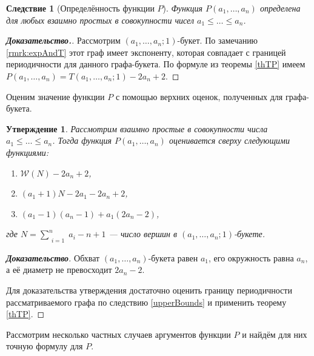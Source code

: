 \documentclass[12pt]{article}
\newtheorem{proposition}[theorem]{Утверждение}
\newtheorem{corollary}[theorem]{Следствие}
\theoremstyle{definition}
\begin{document}
\begin{corollary}[Определённость функции $P$]
Функция $P(a_1, \dots, a_n)$ определена для любых взаимно простых в совокупности чисел $a_1 \le \dots \le a_n$.
\end{corollary}
\begin{proof}[\textbf{Доказательство.}]
Рассмотрим $(a_1, \dots, a_n; 1)$-букет. По замечанию \ref{rmrk:expAndT} этот граф имеет экспоненту, которая совпадает с границей периодичности для данного графа-букета. По формуле из теоремы \ref{thTP} имеем $P(a_1, \dots, a_n) = T(a_1, \dots, a_n; 1) - 2a_n + 2$.
\end{proof}

Оценим значение функции $P$ с помощью верхних оценок, полученных для графа-букета.

\begin{proposition}
\label{upperBoundsP}
Рассмотрим взаимно простые в совокупности числа $a_1 \le \dots \le a_n$. Тогда функция $P(a_1, \dots, a_n)$ оценивается сверху следующими функциями:
\begin{enumerate}
\item $\mathcal{W}(N) - 2a_n + 2$,
\item $(a_1 + 1)N - 2a_1 - 2a_n + 2$,
\item $(a_1 - 1)(a_n - 1) + a_1(2a_n - 2)$,
\end{enumerate}
где $N = \sum\limits_{\substack{i=1}}^n a_i - n + 1$ --- число вершин в $(a_1, \dots, a_n; 1)$-букете.
\end{proposition}
\begin{proof}[\textbf{Доказательство}]
Обхват $(a_1, \dots, a_n)$-букета равен $a_1$, его окружность равна $a_n$, а её диаметр не превосходит $2a_n - 2$.

Для доказательства утверждения достаточно оценить границу периодичности рассматриваемого графа по следствию \ref{upperBounds} и применить теорему \ref{thTP}.
\end{proof}

Рассмотрим несколько частных случаев аргументов функции $P$ и найдём для них точную формулу для $P$.
\end{document}
